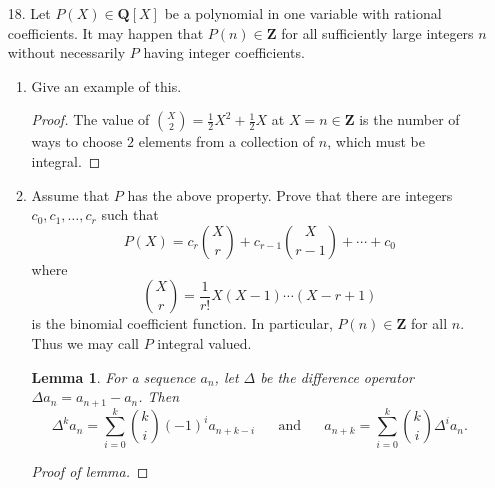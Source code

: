 \documentclass[10pt]{article}
\newcommand{\Q}{\mathbf{Q}}
\newcommand{\Z}{\mathbf{Z}}
\newtheorem*{lem}{Lemma}
\begin{document}
\begin{enumerate}
\item[18.] Let $P(X) \in \Q[X]$ be a polynomial in one variable with rational coefficients.  It may happen that $P(n) \in \Z$ for all sufficiently large integers $n$ without necessarily $P$ having integer coefficients.
\begin{enumerate}
\item Give an example of this.
\begin{proof}
The value of $\binom{X}{2} = \frac12 X^2 + \frac12 X$ at $X = n \in \Z$ is the number of ways to choose $2$ elements from a collection of $n$, which must be integral.
\end{proof}
\item Assume that $P$ has the above property.  Prove that there are integers $c_0, c_1, \dots , c_r$ such that
$$
P(X) = c_r \binom{X}{r} + c_{r-1} \binom{X}{r-1} + \cdots + c_0
$$
where
$$
\binom{X}{r} = \frac{1}{r!}X(X-1) \cdots (X-r+1)
$$
is the binomial coefficient function.  In particular, $P(n) \in \Z$ for all $n$.  Thus we may call $P$ integral valued.

\begin{lem}
For a sequence $a_n$, let $\Delta$ be the difference operator $\Delta a_n = a_{n+1} - a_n$.  Then
$$
\Delta^k a_n = \sum_{i=0}^k \binom{k}{i} (-1)^i a_{n+k-i} \hspace{20pt} \text{and} \hspace{20pt} a_{n+k} = \sum_{i=0}^k \binom{k}{i}\Delta^i a_n.
$$
\end{lem}

\begin{proof}[Proof of lemma]


\end{proof}
\end{enumerate}
\end{enumerate}
\end{document}
